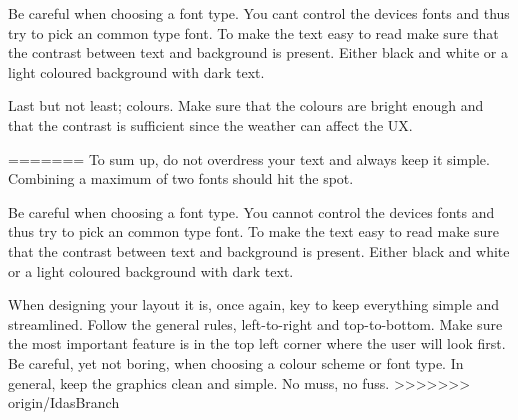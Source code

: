 Be careful when choosing a font type. You cant control the devices fonts and thus try to pick an common type font.  \cite{Sardo} To make the text easy to read make sure that the contrast between text and background is present. Either black and white or a light coloured background with dark text. \cite{Sardo}%

Last but not least; colours. Make sure that the colours are bright enough and that the contrast is sufficient since the weather can affect the UX. \cite{Sardo} %


=======
To sum up, do not overdress your text and always keep it simple. Combining a maximum of two fonts should hit the spot.\cite{TypeComb}

Be careful when choosing a font type. You cannot control the devices fonts and thus try to pick an common type font.  \cite{Graphic} To make the text easy to read make sure that the contrast between text and background is present. Either black and white or a light coloured background with dark text. \cite{Graphic}

When designing your layout it is, once again, key to keep everything simple and streamlined. 
Follow the general rules, left-to-right and top-to-bottom. Make sure the most important feature is in the top left corner where the user will look first.\cite{Graphic}
Be careful, yet not boring, when choosing a colour scheme or font type. 
In general, keep the graphics clean and simple. No muss, no fuss. 
>>>>>>> origin/IdasBranch
